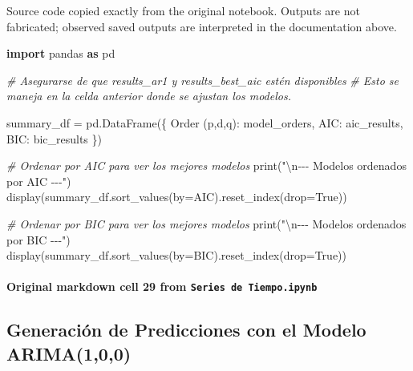 \documentclass[
  11pt,
]{article}
\newenvironment{Shaded}{}{}
\newcommand{\BuiltInTok}[1]{\textcolor[rgb]{0.00,0.50,0.00}{#1}}
\newcommand{\CharTok}[1]{\textcolor[rgb]{0.25,0.44,0.63}{#1}}
\newcommand{\CommentTok}[1]{\textcolor[rgb]{0.38,0.63,0.69}{\textit{#1}}}
\newcommand{\ImportTok}[1]{\textcolor[rgb]{0.00,0.50,0.00}{\textbf{#1}}}
\newcommand{\NormalTok}[1]{#1}
\newcommand{\OperatorTok}[1]{\textcolor[rgb]{0.40,0.40,0.40}{#1}}
\newcommand{\StringTok}[1]{\textcolor[rgb]{0.25,0.44,0.63}{#1}}
\newcommand{\VariableTok}[1]{\textcolor[rgb]{0.10,0.09,0.49}{#1}}
\begin{document}
Source code copied exactly from the original notebook. Outputs are not fabricated; observed saved outputs are interpreted in the documentation above.

\begin{Shaded}
\begin{Highlighting}[]
\ImportTok{import}\NormalTok{ pandas }\ImportTok{as}\NormalTok{ pd}

\CommentTok{\# Asegurarse de que \textquotesingle{}results\_ar1\textquotesingle{} y \textquotesingle{}results\_best\_aic\textquotesingle{} estén disponibles}
\CommentTok{\# Esto se maneja en la celda anterior donde se ajustan los modelos.}

\NormalTok{summary\_df }\OperatorTok{=}\NormalTok{ pd.DataFrame(\{}
    \StringTok{\textquotesingle{}Order (p,d,q)\textquotesingle{}}\NormalTok{: model\_orders,}
    \StringTok{\textquotesingle{}AIC\textquotesingle{}}\NormalTok{: aic\_results,}
    \StringTok{\textquotesingle{}BIC\textquotesingle{}}\NormalTok{: bic\_results}
\NormalTok{\})}

\CommentTok{\# Ordenar por AIC para ver los mejores modelos}
\BuiltInTok{print}\NormalTok{(}\StringTok{"}\CharTok{\textbackslash{}n}\StringTok{{-}{-}{-} Modelos ordenados por AIC {-}{-}{-}"}\NormalTok{)}
\NormalTok{display(summary\_df.sort\_values(by}\OperatorTok{=}\StringTok{\textquotesingle{}AIC\textquotesingle{}}\NormalTok{).reset\_index(drop}\OperatorTok{=}\VariableTok{True}\NormalTok{))}

\CommentTok{\# Ordenar por BIC para ver los mejores modelos}
\BuiltInTok{print}\NormalTok{(}\StringTok{"}\CharTok{\textbackslash{}n}\StringTok{{-}{-}{-} Modelos ordenados por BIC {-}{-}{-}"}\NormalTok{)}
\NormalTok{display(summary\_df.sort\_values(by}\OperatorTok{=}\StringTok{\textquotesingle{}BIC\textquotesingle{}}\NormalTok{).reset\_index(drop}\OperatorTok{=}\VariableTok{True}\NormalTok{))}
\end{Highlighting}
\end{Shaded}

\paragraph{\texorpdfstring{Original markdown cell 29 from \texttt{Series\ de\ Tiempo.ipynb}}{Original markdown cell 29 from Series de Tiempo.ipynb}}\label{original-markdown-cell-29-from-series-de-tiempoipynb}

\subsection{Generación de Predicciones con el Modelo ARIMA(1,0,0)}\label{generaciuxf3n-de-predicciones-con-el-modelo-arima100}
\end{document}
